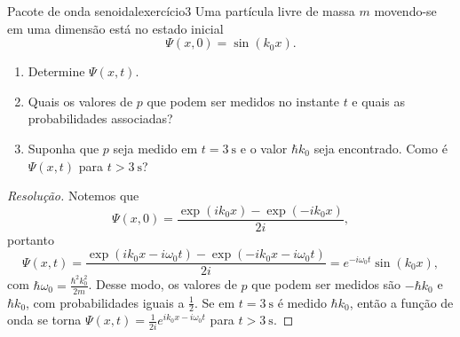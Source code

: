\begin{exercício}{Pacote de onda senoidal}{exercício3}
    Uma partícula livre de massa \(m\) movendo-se em uma dimensão está no estado inicial
    \begin{equation*}
        \Psi(x,0) = \sin(k_0x).
    \end{equation*}
    \begin{enumerate}[label=(\alph*)]
        \item Determine \(\Psi(x,t).\)
        \item Quais os valores de \(p\) que podem ser medidos no instante \(t\) e quais as probabilidades associadas?
        \item Suponha que \(p\) seja medido em \(t = \SI{3}{\second}\) e o valor \(\hbar k_0\) seja encontrado. Como é \(\Psi(x,t)\) para \(t > \SI{3}{\second}\)?
    \end{enumerate}
\end{exercício}
\begin{proof}[Resolução]
    Notemos que
    \begin{equation*}
        \Psi(x,0) = \frac{\exp(ik_0 x) - \exp(-ik_0x)}{2i},
    \end{equation*}
    portanto
    \begin{equation*}
        \Psi(x,t) = \frac{\exp(i k_0 x - i \omega_0 t) - \exp(-ik_0 x-i\omega_0t)}{2i} = e^{-i\omega_0 t} \sin(k_0x),
    \end{equation*}
    com \(\hbar \omega_0 = \frac{\hbar^2 k_0^2}{2m}\). Desse modo, os valores de \(p\) que podem ser medidos são \(-\hbar k_0\) e \(\hbar k_0\), com probabilidades iguais a \(\frac12\). Se em \(t = \SI{3}{\second}\) é medido \(\hbar k_0\), então a função de onda se torna \(\Psi(x,t) = \frac1{2i}e^{ik_0x - i\omega_0 t}\) para \(t > \SI{3}{\second}\).
\end{proof}
